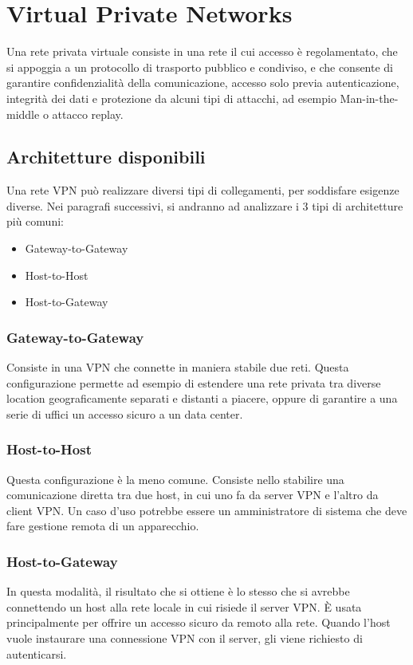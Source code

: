 \section{Virtual Private Networks }
Una rete privata virtuale consiste in una rete il cui accesso è regolamentato, che si appoggia a un protocollo di trasporto pubblico e condiviso, e che consente di garantire confidenzialità della comunicazione, accesso solo previa autenticazione, integrità dei dati e protezione da alcuni tipi di attacchi, ad esempio Man-in-the-middle o attacco replay.

\subsection{Architetture disponibili}
Una rete VPN può realizzare diversi tipi di collegamenti, per soddisfare esigenze diverse. Nei paragrafi successivi, si andranno ad analizzare i 3 tipi di architetture più comuni:
\begin{itemize}
    \item Gateway-to-Gateway
    \item Host-to-Host
    \item Host-to-Gateway
\end{itemize}

\subsubsection{Gateway-to-Gateway}
Consiste in una VPN che connette in maniera stabile due reti. Questa configurazione permette ad esempio di estendere una rete privata tra diverse location geograficamente separati e distanti a piacere, oppure di garantire a una serie di uffici un accesso sicuro a un data center.

\subsubsection{Host-to-Host}
Questa configurazione è la meno comune. Consiste nello stabilire una comunicazione diretta tra due host, in cui uno fa da server VPN e l'altro da client VPN. Un caso d'uso potrebbe essere un amministratore di sistema che deve fare gestione remota di un apparecchio.

\subsubsection{Host-to-Gateway}
In questa modalità, il risultato che si ottiene è lo stesso che si avrebbe connettendo un host alla rete locale in cui risiede il server VPN.
È usata principalmente per offrire un accesso sicuro da remoto alla rete. Quando l'host vuole instaurare una connessione VPN con il server, gli viene richiesto di autenticarsi.

